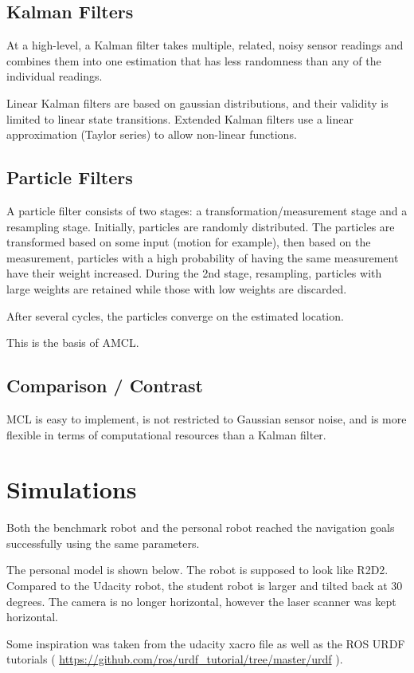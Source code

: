 \documentclass[10pt,journal,compsoc]{IEEEtran}
\begin{document}
\subsection{Kalman Filters}
At a high-level, a Kalman filter takes multiple, related, noisy sensor readings and combines them into one estimation that has less randomness than any of the individual readings.

Linear Kalman filters are based on gaussian distributions, and their validity is limited to linear state transitions. Extended Kalman filters use a linear approximation (Taylor series) to allow non-linear functions.

\subsection{Particle Filters}
A particle filter consists of two stages: a transformation/measurement stage and a resampling stage. Initially, particles are randomly distributed. The particles are transformed based on some input (motion for example), then based on the measurement, particles with a high probability of having the same measurement have their weight increased. During the 2nd stage, resampling, particles with large weights are retained while those with low weights are discarded.

After several cycles, the particles converge on the estimated location.

This is the basis of AMCL.

\subsection{Comparison / Contrast}
MCL is easy to implement, is not restricted to Gaussian sensor noise, and is more flexible in terms of computational resources than a Kalman filter.

\section{Simulations}
Both the benchmark robot and the personal robot reached the navigation goals successfully using the same parameters. 

The personal model is shown below. The robot is supposed to look like R2D2. Compared to the Udacity robot, the student robot is larger and tilted back at 30 degrees. The camera is no longer horizontal, however the laser scanner was kept horizontal.

Some inspiration was taken from the udacity xacro file as well as the ROS URDF tutorials (
\url{https://github.com/ros/urdf_tutorial/tree/master/urdf}
).
\end{document}
